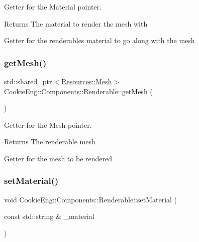 Getter for the Material pointer. 

\begin{DoxyReturn}{Returns}
The material to render the mesh with
\end{DoxyReturn}
Getter for the renderables material to go along with the mesh \mbox{\label{class_cookie_eng_1_1_components_1_1_renderable_a37002e38b2ea9a39c31dc5d610ce827b}} 
\subsubsection{\texorpdfstring{get\+Mesh()}{getMesh()}}
{\footnotesize\ttfamily std\+::shared\+\_\+ptr$<$\hyperlink{struct_cookie_eng_1_1_resources_1_1_mesh}{Resources\+::\+Mesh}$>$ Cookie\+Eng\+::\+Components\+::\+Renderable\+::get\+Mesh (\begin{DoxyParamCaption}{ }\end{DoxyParamCaption})\hspace{0.3cm}{\ttfamily [inline]}}



Getter for the Mesh pointer. 

\begin{DoxyReturn}{Returns}
The renderable mesh
\end{DoxyReturn}
Getter for the mesh to be rendered \mbox{\label{class_cookie_eng_1_1_components_1_1_renderable_a5ea9d1153bbe51b264c20102f8c72db9}} 
\subsubsection{\texorpdfstring{set\+Material()}{setMaterial()}}
{\footnotesize\ttfamily void Cookie\+Eng\+::\+Components\+::\+Renderable\+::set\+Material (\begin{DoxyParamCaption}\item[{const std\+::string \&}]{\+\_\+material }\end{DoxyParamCaption})}



